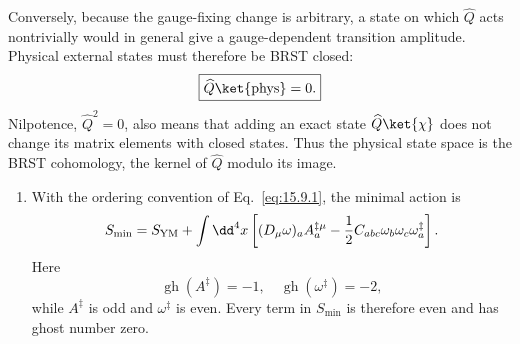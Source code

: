 \begin{enumerate}
\begin{enumerate}
      Conversely, because the gauge-fixing change is arbitrary, a state on
      which \(\widehat Q\) acts nontrivially would in general give a
      gauge-dependent transition amplitude.  Physical external states must
      therefore be BRST closed:
      \[
        \boxed{\widehat Q\ket{\mathrm{phys}}=0.}
      \]
      Nilpotence, \(\widehat Q^2=0\), also means that adding an exact state
      \(\widehat Q\ket{\chi}\) does not change its matrix elements with
      closed states.  Thus the physical state space is the BRST cohomology,
      the kernel of \(\widehat Q\) modulo its image.
  \end{enumerate}

  \begin{enumerate}
    \item[(a)]
    With the ordering convention of Eq.~\eqref{eq:15.9.1}, the minimal action
    is
    \[
      S_{\min}=S_{\rm YM}
        +\int \dd^4x\left[
          (D_\mu\omega)_a A_a^{\ddagger\mu}
          -\frac12C_{abc}\omega_b\omega_c\omega_a^\ddagger
        \right].
    \]
    Here
    \[
      \operatorname{gh}(A^\ddagger)=-1,\quad
      \operatorname{gh}(\omega^\ddagger)=-2,
    \]
    while \(A^\ddagger\) is odd and \(\omega^\ddagger\) is even.  Every term
    in \(S_{\min}\) is therefore even and has ghost number zero.


\end{enumerate}
\end{enumerate}

